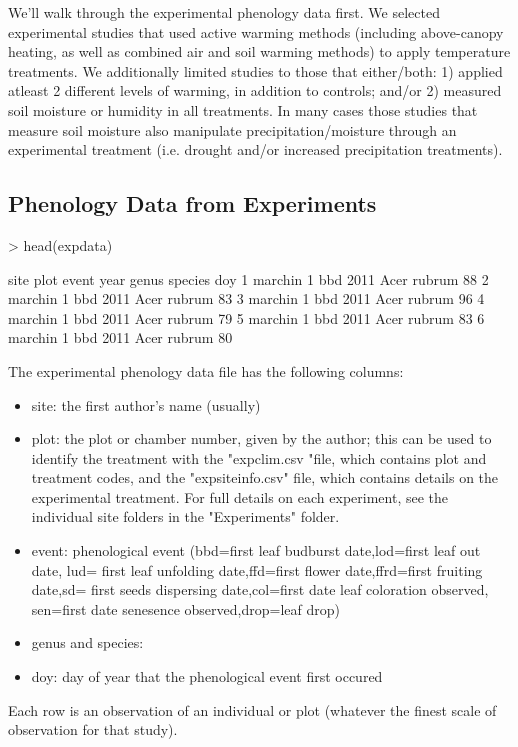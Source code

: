 \documentclass{article}
\begin{document}
We'll walk through the experimental phenology data first. We selected experimental studies that used active warming methods (including above-canopy heating, as well as combined air and soil warming methods) to apply temperature treatments. We additionally limited studies to those that either/both: 1) applied atleast 2 different levels of warming, in addition to controls; and/or 2) measured soil moisture or humidity in all treatments. In many cases those studies that measure soil moisture also manipulate precipitation/moisture through an experimental treatment (i.e. drought and/or increased precipitation treatments).
\subsection{Phenology Data from Experiments}

\begin{Schunk}
\begin{Sinput}
> head(expdata)
\end{Sinput}
\begin{Soutput}
     site plot event year genus species doy
1 marchin    1   bbd 2011  Acer  rubrum  88
2 marchin    1   bbd 2011  Acer  rubrum  83
3 marchin    1   bbd 2011  Acer  rubrum  96
4 marchin    1   bbd 2011  Acer  rubrum  79
5 marchin    1   bbd 2011  Acer  rubrum  83
6 marchin    1   bbd 2011  Acer  rubrum  80
\end{Soutput}
\end{Schunk}
The experimental phenology data file has the following columns:
\begin{itemize}
  \item site: the first author's name (usually)
\item plot: the plot or chamber number, given by the author; this can be used to identify the treatment with the "expclim.csv "file, which contains plot and treatment codes, and the "expsiteinfo.csv" file, which contains details on the experimental treatment. For full details on each experiment, see the individual site folders in the "Experiments" folder.
\item event: phenological event (bbd=first leaf budburst date,lod=first leaf out date, lud= first leaf unfolding date,ffd=first flower date,ffrd=first fruiting date,sd= first seeds dispersing date,col=first date leaf coloration observed, sen=first date senesence observed,drop=leaf drop)
\item genus and species: 
\item doy: day of year that the phenological event first occured

\end{itemize}
Each row is an observation of an individual or plot (whatever the finest scale of observation for that study).
\end{document}
